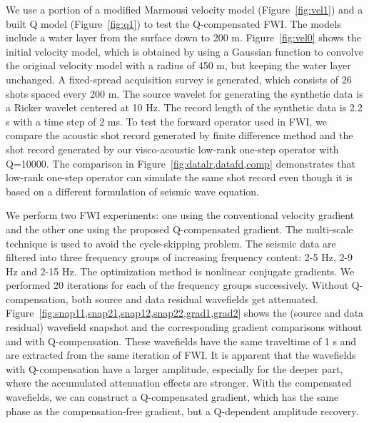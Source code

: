 We use a portion of a modified Marmousi velocity model (Figure~\ref{fig:vel1}) and a built Q model (Figure~\ref{fig:q1}) to test the Q-compensated FWI.
The models include a water layer from the surface down to 200 m.
Figure~\ref{fig:vel0} shows the initial velocity model, which is obtained by using a Gaussian function to convolve the original velocity model with a radius of 450 m, but keeping the water layer unchanged.
A fixed-spread acquisition survey is generated, which consists of 26 shots spaced every 200 m.
The source wavelet for generating the synthetic data is a Ricker wavelet centered at 10 Hz.
The record length of the synthetic data is 2.2 s with a time step of 2 ms.
To test the forward operator used in FWI, we compare the acoustic shot record generated by finite difference method and the shot record generated by our
visco-acoustic low-rank one-step operator with Q=10000.
The comparison in Figure~\ref{fig:datalr,datafd,comp} demonstrates that low-rank one-step operator can simulate the same shot record even though it is based on a different formulation of seismic wave equation.


We perform two FWI experiments: one using the conventional velocity gradient and the other one using the proposed Q-compensated gradient.
The multi-scale technique \cite[]{bunks95} is used to avoid the cycle-skipping problem.
The seismic data are filtered into three frequency groups of increasing frequency content: 2-5 Hz, 2-9 Hz and 2-15 Hz.
The optimization method is nonlinear conjugate gradients.
We performed 20 iterations for each of the frequency groups successively.
Without Q-compensation, both source and data residual wavefields get attenuated.
Figure~\ref{fig:snap11,snap21,snap12,snap22,grad1,grad2} shows the (source and data residual) wavefield snapshot and the corresponding gradient comparisons without and with Q-compensation.
These wavefields have the same traveltime of 1 s and are extracted from the same iteration of FWI.
It is apparent that the wavefields with Q-compensation have a larger amplitude, especially for the deeper part,
where the accumulated attenuation effects are stronger.
With the compensated wavefields, we can construct a Q-compensated gradient,
which has the same phase as the compensation-free gradient, but a Q-dependent amplitude recovery.

